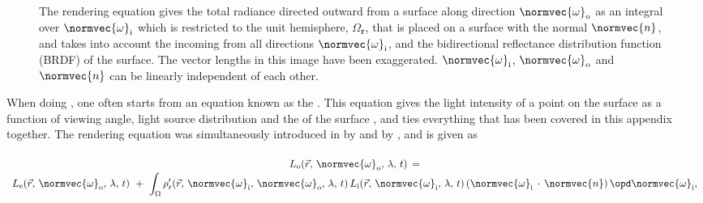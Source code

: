 \begin{figure}
    \caption{The rendering equation gives the total radiance directed outward from a surface along direction $\normvec{\omega}_{\text{o}}$ as an integral over $\normvec{\omega}_{\text{i}}$ which is restricted to the unit hemisphere, $\Omega_{\textbf{r}}$, that is placed on a surface with the normal $\normvec{n}$, and takes into account the  incoming from all directions $\normvec{\omega}_{\text{i}}$, and the bidirectional reflectance distribution function (BRDF) of the surface. The vector lengths in this image have been exaggerated. $\normvec{\omega}_{\text{i}}$, $\normvec{\omega}_{\text{o}}$ and $\normvec{n}$ can be linearly independent of each other.}
    \label{fig:renderingequation}
\end{figure}

When doing , one often starts from an equation known as the . This equation gives the light intensity of a point on the surface as a function of viewing angle, light source distribution and the \BRDF of the surface \citep{Nicodemus1965}, and ties everything that has been covered in this appendix together. The rendering equation was simultaneously introduced in  by \citet{Immel1986} and by \citet{Kajiya1986}, and is given as

\begin{equation} \label{eq:rendering_equation_original}
\renewcommand*{\arraystretch}{1.5}
\begin{array}{c}
L_{\text{o}}(\vec{r},\,\normvec{\omega}_{\text{o}},\, \lambda,\, t) \,= \\
\displaystyle L_{\text{e}}(\vec{r},\, \normvec{\omega}_{\text{o}},\, \lambda,\, t) \ + \ \int_\Omega \rho'_{\text{r}}(\vec{r},\, \normvec{\omega}_{\text{i}},\, \normvec{\omega}_{\text{o}},\, \lambda,\, t)\, L_{\text{i}}(\vec{r},\, \normvec{\omega}_{\text{i}},\, \lambda,\, t)\, (\normvec{\omega}_{\text{i}}\,\cdot\,\normvec{n})\, \opd \normvec{\omega}_{\text{i}},
\end{array}
\end{equation}

